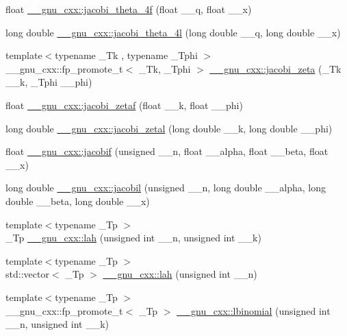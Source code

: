 \begin{DoxyCompactItemize}
\item 
float \hyperlink{group__gnu__math__spec__func_ga57dcc5ae4b1a3d1e38adccad85204bca}{\+\_\+\+\_\+gnu\+\_\+cxx\+::jacobi\+\_\+theta\+\_\+4f} (float \+\_\+\+\_\+q, float \+\_\+\+\_\+x)
\item 
long double \hyperlink{group__gnu__math__spec__func_ga7c2a13198bdfd3f8cf1bc1758b1f56be}{\+\_\+\+\_\+gnu\+\_\+cxx\+::jacobi\+\_\+theta\+\_\+4l} (long double \+\_\+\+\_\+q, long double \+\_\+\+\_\+x)
\item 
{\footnotesize template$<$typename \+\_\+\+Tk , typename \+\_\+\+Tphi $>$ }\\\+\_\+\+\_\+gnu\+\_\+cxx\+::fp\+\_\+promote\+\_\+t$<$ \+\_\+\+Tk, \+\_\+\+Tphi $>$ \hyperlink{group__gnu__math__spec__func_ga639be4ebef9a20572375ec534be52b07}{\+\_\+\+\_\+gnu\+\_\+cxx\+::jacobi\+\_\+zeta} (\+\_\+\+Tk \+\_\+\+\_\+k, \+\_\+\+Tphi \+\_\+\+\_\+phi)
\item 
float \hyperlink{group__gnu__math__spec__func_gaedb6b352331c67b9dea73660e2045668}{\+\_\+\+\_\+gnu\+\_\+cxx\+::jacobi\+\_\+zetaf} (float \+\_\+\+\_\+k, float \+\_\+\+\_\+phi)
\item 
long double \hyperlink{group__gnu__math__spec__func_ga9db158df9459aa12c840724338753913}{\+\_\+\+\_\+gnu\+\_\+cxx\+::jacobi\+\_\+zetal} (long double \+\_\+\+\_\+k, long double \+\_\+\+\_\+phi)
\item 
float \hyperlink{group__gnu__math__spec__func_ga450db12e06d6993d169afab5b3f6d0b8}{\+\_\+\+\_\+gnu\+\_\+cxx\+::jacobif} (unsigned \+\_\+\+\_\+n, float \+\_\+\+\_\+alpha, float \+\_\+\+\_\+beta, float \+\_\+\+\_\+x)
\item 
long double \hyperlink{group__gnu__math__spec__func_ga2898a5ebf451eaf259ecfcdd171aa72b}{\+\_\+\+\_\+gnu\+\_\+cxx\+::jacobil} (unsigned \+\_\+\+\_\+n, long double \+\_\+\+\_\+alpha, long double \+\_\+\+\_\+beta, long double \+\_\+\+\_\+x)
\item 
{\footnotesize template$<$typename \+\_\+\+Tp $>$ }\\\+\_\+\+Tp \hyperlink{group__gnu__math__spec__func_gaa3491fabb0a6ef54a946a7a23ca866c7}{\+\_\+\+\_\+gnu\+\_\+cxx\+::lah} (unsigned int \+\_\+\+\_\+n, unsigned int \+\_\+\+\_\+k)
\item 
{\footnotesize template$<$typename \+\_\+\+Tp $>$ }\\std\+::vector$<$ \+\_\+\+Tp $>$ \hyperlink{group__gnu__math__spec__func_ga161fe80a0d88f67a5a16ef2dcc3d4645}{\+\_\+\+\_\+gnu\+\_\+cxx\+::lah} (unsigned int \+\_\+\+\_\+n)
\item 
{\footnotesize template$<$typename \+\_\+\+Tp $>$ }\\\+\_\+\+\_\+gnu\+\_\+cxx\+::fp\+\_\+promote\+\_\+t$<$ \+\_\+\+Tp $>$ \hyperlink{group__gnu__math__spec__func_gabfa5aeba56edfa110846fc8e76963bc2}{\+\_\+\+\_\+gnu\+\_\+cxx\+::lbinomial} (unsigned int \+\_\+\+\_\+n, unsigned int \+\_\+\+\_\+k)

\end{DoxyCompactItemize}
